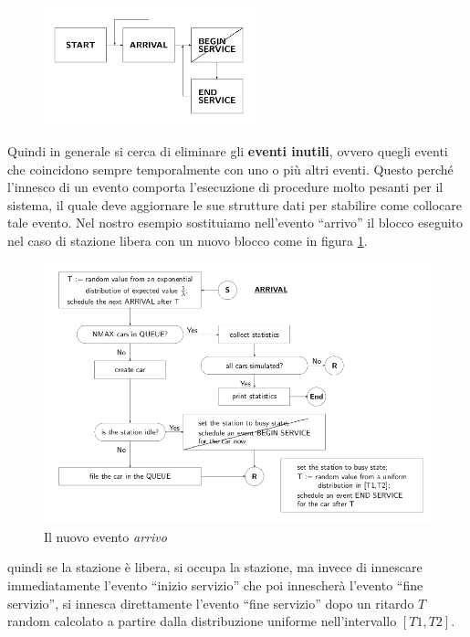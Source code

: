\documentclass[11pt]{book}
\begin{document}
\begin{figure}[H]
  \centering
  \includegraphics[width=0.55\textwidth]{images/cap11fig10.png}
\end{figure}

Quindi in generale si cerca di eliminare gli {\bf eventi inutili},
ovvero quegli eventi che coincidono sempre temporalmente con uno o
pi\`u altri eventi. Questo perch\'e l'innesco di un evento comporta
l'esecuzione di procedure molto pesanti per il sistema, il quale deve
aggiornare le sue strutture dati per stabilire come collocare tale
evento. Nel nostro esempio sostituiamo nell'evento ``arrivo'' il
blocco eseguito nel caso di stazione libera con un nuovo blocco come
in figura \ref{cap11fig11}.

\begin{figure}[h!]
  \centering
  \includegraphics[width=\textwidth]{images/cap11fig11.png}
  \caption{Il nuovo evento {\em arrivo}}
  \label{cap11fig11}
\end{figure}

quindi se la stazione \`e libera, si occupa la stazione, ma invece di
innescare immediatamente l'evento ``inizio servizio'' che poi
innescher\`a l'evento ``fine servizio'', si innesca direttamente
l'evento ``fine servizio'' dopo un ritardo $T$ random calcolato a
partire dalla distribuzione uniforme nell'intervallo $[T1,T2]$.
\end{document}
